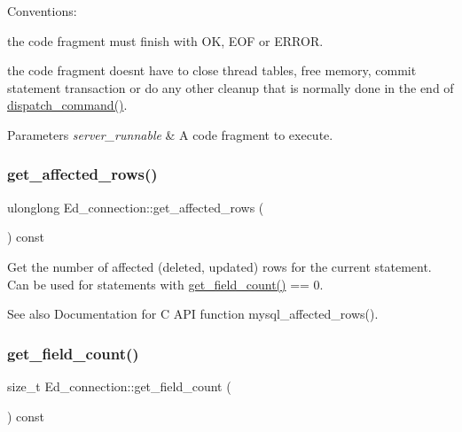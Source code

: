 Conventions\+:
\begin{DoxyItemize}
\item the code fragment must finish with OK, E\+OF or E\+R\+R\+OR.
\item the code fragment doesn\textquotesingle{}t have to close thread tables, free memory, commit statement transaction or do any other cleanup that is normally done in the end of \mbox{\hyperlink{group__Runtime__Environment_gabf07206792036bfb47e5bb8eb0f20bc4}{dispatch\+\_\+command()}}.
\end{DoxyItemize}


\begin{DoxyParams}{Parameters}
{\em server\+\_\+runnable} & A code fragment to execute. \\
\hline
\end{DoxyParams}
\mbox{\label{classEd__connection_afba697853fd865d59c2bfbf851e926fe}} 
\subsubsection{\texorpdfstring{get\+\_\+affected\+\_\+rows()}{get\_affected\_rows()}}
{\footnotesize\ttfamily ulonglong Ed\+\_\+connection\+::get\+\_\+affected\+\_\+rows (\begin{DoxyParamCaption}{ }\end{DoxyParamCaption}) const\hspace{0.3cm}{\ttfamily [inline]}}

Get the number of affected (deleted, updated) rows for the current statement. Can be used for statements with \mbox{\hyperlink{classEd__connection_af704fb99d9029578af2d1acc301b8d51}{get\+\_\+field\+\_\+count()}} == 0.

\begin{DoxySeeAlso}{See also}
Documentation for C A\+PI function mysql\+\_\+affected\+\_\+rows(). 
\end{DoxySeeAlso}
\mbox{\label{classEd__connection_af704fb99d9029578af2d1acc301b8d51}} 
\subsubsection{\texorpdfstring{get\+\_\+field\+\_\+count()}{get\_field\_count()}}
{\footnotesize\ttfamily size\+\_\+t Ed\+\_\+connection\+::get\+\_\+field\+\_\+count (\begin{DoxyParamCaption}{ }\end{DoxyParamCaption}) const\hspace{0.3cm}{\ttfamily [inline]}}

